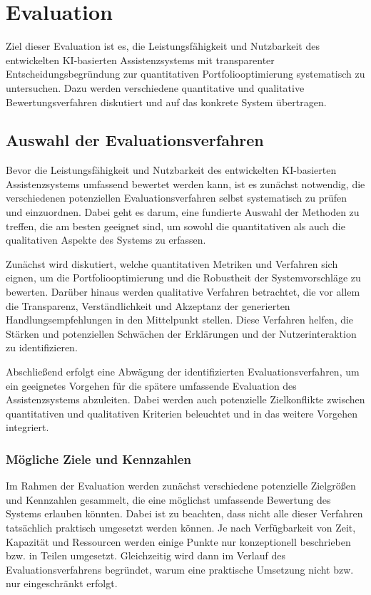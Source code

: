 
\chapter{Evaluation}
\label{chap:evaluation}

  Ziel dieser Evaluation ist es, die Leistungsfähigkeit und Nutzbarkeit des entwickelten \acs{KI}-basierten Assistenzsystems mit transparenter Entscheidungsbegründung zur quantitativen Portfoliooptimierung systematisch zu untersuchen.
  Dazu werden verschiedene quantitative und qualitative Bewertungsverfahren diskutiert und auf das konkrete System übertragen.

  \section{Auswahl der Evaluationsverfahren}
  \label{sec:auswahl_evaluation}

    Bevor die Leistungsfähigkeit und Nutzbarkeit des entwickelten \acs{KI}-basierten Assistenzsystems umfassend bewertet werden kann, ist es zunächst notwendig, die verschiedenen potenziellen Evaluationsverfahren selbst systematisch zu prüfen und einzuordnen.
    Dabei geht es darum, eine fundierte Auswahl der Methoden zu treffen, die am besten geeignet sind, um sowohl die quantitativen als auch die qualitativen Aspekte des Systems zu erfassen.

    Zunächst wird diskutiert, welche quantitativen Metriken und Verfahren sich eignen, um die Portfoliooptimierung und die Robustheit der Systemvorschläge zu bewerten.
    Darüber hinaus werden qualitative Verfahren betrachtet, die vor allem die Transparenz, Verständlichkeit und Akzeptanz der generierten Handlungsempfehlungen in den Mittelpunkt stellen.
    Diese Verfahren helfen, die Stärken und potenziellen Schwächen der Erklärungen und der Nutzerinteraktion zu identifizieren.

    Abschließend erfolgt eine Abwägung der identifizierten Evaluationsverfahren, um ein geeignetes Vorgehen für die spätere umfassende Evaluation des Assistenzsystems abzuleiten.
    Dabei werden auch potenzielle Zielkonflikte zwischen quantitativen und qualitativen Kriterien beleuchtet und in das weitere Vorgehen integriert.

    \subsection{Mögliche Ziele und Kennzahlen}

      Im Rahmen der Evaluation werden zunächst verschiedene potenzielle Zielgrößen und Kennzahlen gesammelt, die eine möglichst umfassende Bewertung des Systems erlauben könnten.
      Dabei ist zu beachten, dass nicht alle dieser Verfahren tatsächlich praktisch umgesetzt werden können.
      Je nach Verfügbarkeit von Zeit, Kapazität und Ressourcen werden einige Punkte nur konzeptionell beschrieben bzw. in Teilen umgesetzt.
      Gleichzeitig wird dann im Verlauf des Evaluationsverfahrens begründet, warum eine praktische Umsetzung nicht bzw. nur eingeschränkt erfolgt.

